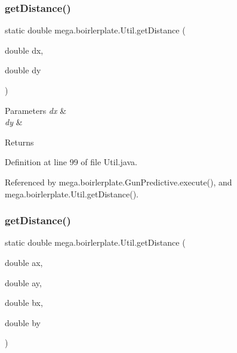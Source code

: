 \subsubsection{\texorpdfstring{get\+Distance()}{getDistance()}\hspace{0.1cm}{\footnotesize\ttfamily [1/2]}}
{\footnotesize\ttfamily static double mega.\+boirlerplate.\+Util.\+get\+Distance (\begin{DoxyParamCaption}\item[{double}]{dx,  }\item[{double}]{dy }\end{DoxyParamCaption})\hspace{0.3cm}{\ttfamily [static]}}


\begin{DoxyParams}{Parameters}
{\em dx} & \\
\hline
{\em dy} & \\
\hline
\end{DoxyParams}
\begin{DoxyReturn}{Returns}

\end{DoxyReturn}


Definition at line 99 of file Util.\+java.



Referenced by mega.\+boirlerplate.\+Gun\+Predictive.\+execute(), and mega.\+boirlerplate.\+Util.\+get\+Distance().

\mbox{\label{classmega_1_1boirlerplate_1_1_util_a5a29f4d77f349eb00f4d2b8ed9b86860}} 
\subsubsection{\texorpdfstring{get\+Distance()}{getDistance()}\hspace{0.1cm}{\footnotesize\ttfamily [2/2]}}
{\footnotesize\ttfamily static double mega.\+boirlerplate.\+Util.\+get\+Distance (\begin{DoxyParamCaption}\item[{double}]{ax,  }\item[{double}]{ay,  }\item[{double}]{bx,  }\item[{double}]{by }\end{DoxyParamCaption})\hspace{0.3cm}{\ttfamily [static]}}


